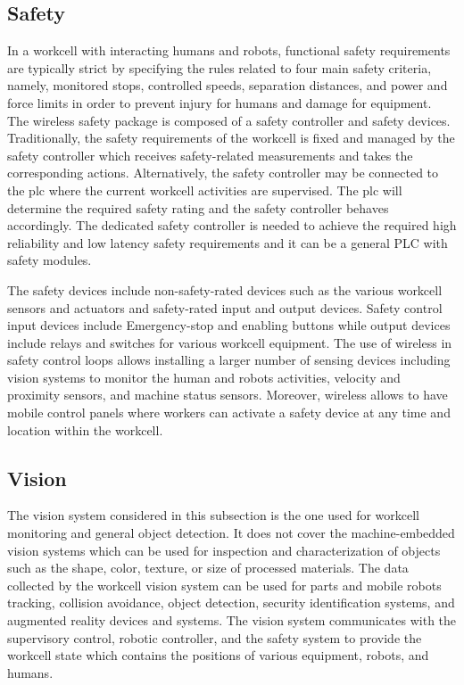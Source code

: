 \subsection{Safety}\label{sysml:sec:safety}

In a workcell with interacting humans and robots, functional safety requirements are typically strict by specifying the rules related to four main safety criteria, namely, monitored stops, controlled speeds, separation distances, and power and force limits in order to prevent injury for humans and damage for equipment. The wireless safety package is composed of a safety controller and safety devices. Traditionally, the safety requirements of the workcell is fixed and managed by the safety controller which receives safety-related measurements and takes the corresponding actions. Alternatively, the safety controller may be connected to the \gls{plc} where the current workcell activities are supervised.  The \gls{plc} will determine the required safety rating and the safety controller behaves accordingly. The dedicated safety controller is needed to achieve the required high reliability and low latency safety requirements and it can be a general PLC with safety modules. 

The safety devices include non-safety-rated devices such as the various workcell sensors and actuators and safety-rated input and output devices. Safety control input devices include Emergency-stop and enabling buttons while output devices include relays and switches for various workcell equipment. The use of wireless in safety control loops allows installing a larger number of sensing devices including vision systems to monitor the human and robots activities, velocity and proximity sensors, and machine status sensors. Moreover, wireless allows to have mobile control panels where workers can activate a safety device at any time and location within the workcell.        

\subsection{Vision}\label{sysml:sec:vision}
The vision system considered in this subsection is the one used for workcell monitoring and general object detection. It does not cover the machine-embedded vision systems which can be used for inspection and characterization of objects such as the shape, color, texture, or size of processed materials. The data collected by the workcell vision system can be used for parts and mobile robots tracking, collision avoidance, object detection, security identification systems, and augmented reality devices and systems. The vision system communicates with the supervisory control, robotic controller, and the safety system to provide the workcell state which contains the positions of various equipment, robots, and humans. 

